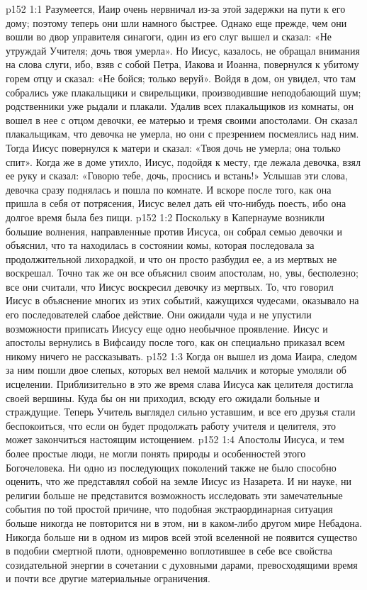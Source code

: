 \vs p152 1:1 Разумеется, Иаир очень нервничал из\hyp{}за этой задержки на пути к его дому; поэтому теперь они шли намного быстрее. Однако еще прежде, чем они вошли во двор управителя синагоги, один из его слуг вышел и сказал: «Не утруждай Учителя; дочь твоя умерла». Но Иисус, казалось, не обращал внимания на слова слуги, ибо, взяв с собой Петра, Иакова и Иоанна, повернулся к убитому горем отцу и сказал: «Не бойся; только веруй». Войдя в дом, он увидел, что там собрались уже плакальщики и свирельщики, производившие неподобающий шум; родственники уже рыдали и плакали. Удалив всех плакальщиков из комнаты, он вошел в нее с отцом девочки, ее матерью и тремя своими апостолами. Он сказал плакальщикам, что девочка не умерла, но они с презрением посмеялись над ним. Тогда Иисус повернулся к матери и сказал: «Твоя дочь не умерла; она только спит». Когда же в доме утихло, Иисус, подойдя к месту, где лежала девочка, взял ее руку и сказал: «Говорю тебе, дочь, проснись и встань!» Услышав эти слова, девочка сразу поднялась и пошла по комнате. И вскоре после того, как она пришла в себя от потрясения, Иисус велел дать ей что\hyp{}нибудь поесть, ибо она долгое время была без пищи.
\vs p152 1:2 Поскольку в Капернауме возникли большие волнения, направленные против Иисуса, он собрал семью девочки и объяснил, что та находилась в состоянии комы, которая последовала за продолжительной лихорадкой, и что он просто разбудил ее, а из мертвых не воскрешал. Точно так же он все объяснил своим апостолам, но, увы, бесполезно; все они считали, что Иисус воскресил девочку из мертвых. То, что говорил Иисус в объяснение многих из этих событий, кажущихся чудесами, оказывало на его последователей слабое действие. Они ожидали чуда и не упустили возможности приписать Иисусу еще одно необычное проявление. Иисус и апостолы вернулись в Вифсаиду после того, как он специально приказал всем никому ничего не рассказывать.
\vs p152 1:3 \pc Когда он вышел из дома Иаира, следом за ним пошли двое слепых, которых вел немой мальчик и которые умоляли об исцелении. Приблизительно в это же время слава Иисуса как целителя достигла своей вершины. Куда бы он ни приходил, всюду его ожидали больные и страждущие. Теперь Учитель выглядел сильно уставшим, и все его друзья стали беспокоиться, что если он будет продолжать работу учителя и целителя, это может закончиться настоящим истощением.
\vs p152 1:4 \pc Апостолы Иисуса, и тем более простые люди, не могли понять природы и особенностей этого Богочеловека. Ни одно из последующих поколений также не было способно оценить, что же представлял собой на земле Иисус из Назарета. И ни науке, ни религии больше не представится возможность исследовать эти замечательные события по той простой причине, что подобная экстраординарная ситуация больше никогда не повторится ни в этом, ни в каком\hyp{}либо другом мире Небадона. Никогда больше ни в одном из миров всей этой вселенной не появится существо в подобии смертной плоти, одновременно воплотившее в себе все свойства созидательной энергии в сочетании с духовными дарами, превосходящими время и почти все другие материальные ограничения.
